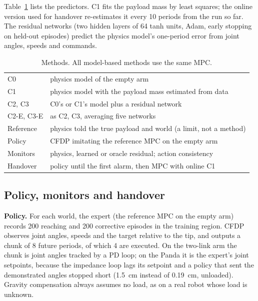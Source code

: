 \documentclass[conference]{IEEEtran}
\newcommand{\Cz}{C0}
\newcommand{\Co}{C1}
\newcommand{\Ct}{C2}
\newcommand{\Cr}{C3}
\begin{document}
Table~\ref{tab:methods} lists the predictors. \Co{} fits the payload mass by least squares; the online version used for handover re-estimates it every 10 periods from the run so far. The residual networks (two hidden layers of 64 tanh units, Adam, early stopping on held-out episodes) predict the physics model's one-period error from joint angles, speeds and commands.

\begin{table}[t]
\centering
\caption{Methods. All model-based methods use the same MPC.}
\label{tab:methods}
\footnotesize
\begin{tabular}{@{}lp{6.1cm}@{}}
\toprule
\Cz & physics model of the empty arm\\
\Co & physics model with the payload mass estimated from data\\
\Ct, \Cr & \Cz's or \Co's model plus a residual network\\
\Ct-E, \Cr-E & as \Ct, \Cr, averaging five networks\\
Reference & physics told the true payload and world (a limit, not a method)\\
\midrule
Policy & CFDP imitating the reference MPC on the empty arm\\
Monitors & physics, learned or oracle residual; action consistency\\
Handover & policy until the first alarm, then MPC with online \Co\\
\bottomrule
\end{tabular}
\end{table}

\subsection{Policy, monitors and handover}

\textbf{Policy.} For each world, the expert (the reference MPC on the empty arm) records 200 reaching and 200 corrective episodes in the training region. CFDP observes joint angles, speeds and the target relative to the tip, and outputs a chunk of 8 future periods, of which 4 are executed. On the two-link arm the chunk is joint angles tracked by a PD loop; on the Panda it is the expert's joint setpoints, because the impedance loop lags its setpoint and a policy that sent the demonstrated angles stopped short (\SI{1.5}{cm} instead of \SI{0.19}{cm}, unloaded). Gravity compensation always assumes no load, as on a real robot whose load is unknown.
\end{document}
